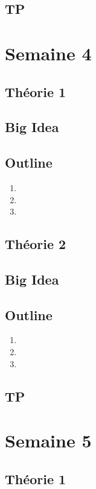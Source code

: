 \documentclass{article}
\begin{document}
\subsection{TP}

\pagebreak
\section{Semaine 4}
\subsection{Théorie 1}
\subsection*{Big Idea}
\subsection*{Outline}
    \begin{enumerate}
    \item
    \item
    \item
    \end{enumerate}
\subsection{Théorie 2}
\subsection*{Big Idea}
\subsection*{Outline}
    \begin{enumerate}
    \item
    \item
    \item
    \end{enumerate}
\subsection{TP}

\pagebreak
\section{Semaine 5}
\subsection{Théorie 1}
\end{document}
